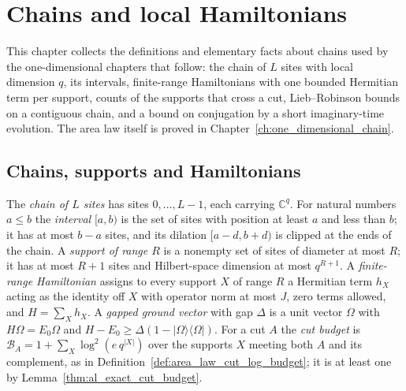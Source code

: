 \chapter{Chains and local Hamiltonians}
\label{ch:one_dimensional_preliminaries}

This chapter collects the definitions and elementary facts about chains
used by the one-dimensional chapters that follow: the chain of $L$ sites
with local dimension $q$, its intervals, finite-range Hamiltonians with one
bounded Hermitian term per support, counts of the supports that cross a
cut, Lieb--Robinson bounds on a contiguous chain, and a bound on conjugation
by a short imaginary-time evolution. The area law itself
is proved in Chapter~\ref{ch:one_dimensional_chain}.

\section{Chains, supports and Hamiltonians}

\begin{definition}
    \label{def:chain_model}
    \leanok
    The \emph{chain of $L$ sites} has sites $0,\ldots,L-1$, each carrying
    $\mathbb C^q$. For natural numbers $a\le b$ the \emph{interval} $[a,b)$ is
    the set of sites with position at least $a$ and less than $b$; it has at
    most $b-a$ sites, and its dilation $[a-d,b+d)$ is clipped at the ends of the
    chain. A \emph{support of range $R$} is a nonempty set of sites of diameter
    at most $R$; it has at most $R+1$ sites and Hilbert-space dimension at most
    $q^{R+1}$. A \emph{finite-range Hamiltonian} assigns to every support $X$
    of range $R$ a Hermitian term $h_X$ acting as the identity off $X$ with
    operator norm at most $J$, zero terms allowed, and
    $H=\sum_X h_X$. A \emph{gapped ground vector} with gap $\Delta$ is a unit
    vector $\Omega$ with $H\Omega=E_0\Omega$ and
    $H-E_0\ge\Delta(1-|\Omega\rangle\langle\Omega|)$. For a cut $A$ the
    \emph{cut budget} is
    $\mathcal B_A=1+\sum_X\log^2(e\,q^{|X|})$ over the supports $X$ meeting
    both $A$ and its complement, as in
    Definition~\ref{def:area_law_cut_log_budget}; it is at least one by
    Lemma~\ref{thm:al_exact_cut_budget}.
\end{definition}

